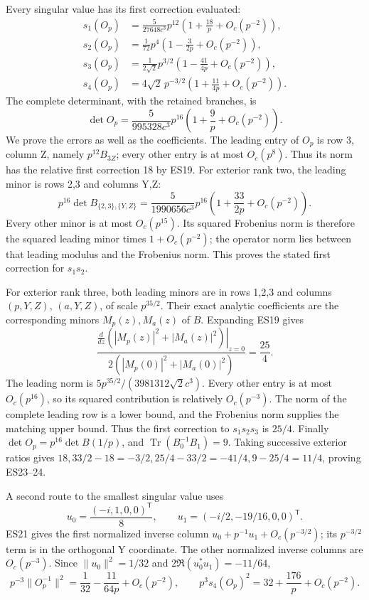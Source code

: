 Every singular value has its first correction evaluated: \[
\boxed{\begin{aligned}
s_1(O_p)&=\frac5{27648c^3}p^{12}\left(1+\frac{18}{p}+O_c(p^{-2})\right),\\
s_2(O_p)&=\frac1{72}p^4\left(1-\frac{3}{2p}+O_c(p^{-2})\right),\\
s_3(O_p)&=\frac1{2\sqrt2}p^{3/2}\left(1-\frac{41}{4p}+O_c(p^{-2})\right),\\
s_4(O_p)&=4\sqrt2\,p^{-3/2}\left(1+\frac{11}{4p}+O_c(p^{-2})\right).
\end{aligned}}
\tag{ES23}
\] The complete determinant, with the retained branches, is \[
\boxed{\det O_p=\frac5{995328c^3}p^{16}\left(1+\frac9p+O_c(p^{-2})\right).}
\tag{ES24}
\] We prove the errors as well as the coefficients. The leading entry of \(O_p\) is row 3, column Z, namely \(p^{12}B_{3Z}\); every other entry is at most \(O_c(p^8)\). Thus its norm has the relative first correction 18 by ES19. For exterior rank two, the leading minor is rows 2,3 and columns Y,Z: \[
p^{16}\det B_{\{2,3\},\{Y,Z\}}
=\frac5{1990656c^3}p^{16}\left(1+\frac{33}{2p}+O_c(p^{-2})\right).
\] Every other minor is at most \(O_c(p^{15})\). Its squared Frobenius norm is therefore the squared leading minor times \(1+O_c(p^{-2})\); the operator norm lies between that leading modulus and the Frobenius norm. This proves the stated first correction for \(s_1s_2\).

For exterior rank three, both leading minors are in rows 1,2,3 and columns \((p,Y,Z)\), \((a,Y,Z)\), of scale \(p^{35/2}\). Their exact analytic coefficients are the corresponding minors \(M_p(z),M_a(z)\) of \(B\). Expanding ES19 gives \[
\frac{\left.\frac d{dz}(|M_p(z)|^2+|M_a(z)|^2)\right|_{z=0}}
{2(|M_p(0)|^2+|M_a(0)|^2)}=\frac{25}{4}.
\] The leading norm is \(5p^{35/2}/(3981312\sqrt2c^3)\). Every other entry is at most \(O_c(p^{16})\), so its squared contribution is relatively \(O_c(p^{-3})\). The norm of the complete leading row is a lower bound, and the Frobenius norm supplies the matching upper bound. Thus the first correction to \(s_1s_2s_3\) is \(25/4\). Finally \(\det O_p=p^{16}\det B(1/p)\), and \(\operatorname{Tr}(B_0^{-1}B_1)=9\). Taking successive exterior ratios gives \(18,33/2-18=-3/2,25/4-33/2=-41/4,9-25/4=11/4\), proving ES23--24.

A second route to the smallest singular value uses
\[
u_0=\frac{(-i,1,0,0)^{\mathsf T}}8,
\qquad u_1=(-i/2,-19/16,0,0)^{\mathsf T}.
\]
ES21 gives the first normalized inverse column \(u_0+p^{-1}u_1+O_c(p^{-3/2})\); its \(p^{-3/2}\) term is in the orthogonal Y coordinate. The other normalized inverse columns are \(O_c(p^{-3})\). Since \(\|u_0\|^2=1/32\) and \(2\Re(u_0^*u_1)=-11/64\), \[
p^{-3}\|O_p^{-1}\|^2=\frac1{32}-\frac{11}{64p}+O_c(p^{-2}),\qquad
\boxed{p^3s_4(O_p)^2=32+\frac{176}{p}+O_c(p^{-2}).}
\tag{ES25}
\]

